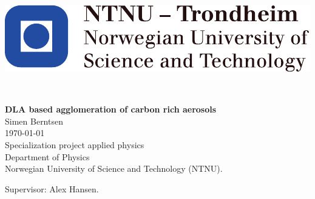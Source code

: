 
\thispagestyle{empty}
\begin{center}
\includegraphics[scale=1.1]{fig/NTNU_logo.pdf}
\end{center}
\mbox{}\\[6pc]
\begin{center}
\Huge{\textbf{DLA based agglomeration of carbon rich aerosols}}\\[2pc]

\Large{
Simen Berntsen\\
}
\large{\today}\\[2pc]

Specialization project applied physics\\
Department of Physics \\
Norwegian University of Science and Technology (NTNU).
\end{center}
\vfill

\noindent Supervisor: Alex Hansen.
\newpage